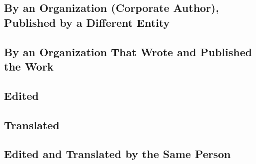\documentclass{article}
\begin{document}
\subsection{By an Organization (Corporate Author), Published by a Different Entity} %
\label{ssub:by_an_organization_corporate_author_published_by_a_different_entity}
\begin{refsection}
	\printbibliography[heading=none]
\end{refsection}
\subsection{By an Organization That Wrote and Published the Work} %
\label{ssub:by_an_organization_that_wrote_and_published_the_work}
\begin{refsection}
	\printbibliography[heading=none]
\end{refsection}
\subsection{Edited} %
\label{ssub:edited}
\begin{refsection}
	\printbibliography[heading=none]
\end{refsection}
\subsection{Translated} %
\label{ssub:translated}
\begin{refsection}
	\printbibliography[heading=none]
\end{refsection}
\subsection{Edited and Translated by the Same Person} %
\label{ssub:edited_and_translated_by_the_same_person}
\begin{refsection}
	\printbibliography[heading=none]
\end{refsection}
\end{document}
